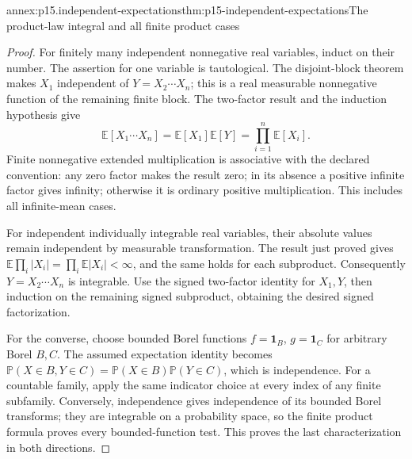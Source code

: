 \begin{annexitem}{annex:p15.independent-expectations}{thm:p15-independent-expectations}{The product-law integral and all finite product cases}
\begin{proof}
For finitely many independent nonnegative real variables, induct on
their number. The assertion for one variable is tautological. The
disjoint-block theorem makes \(X_1\) independent of
\(Y=X_2\cdots X_n\); this is a real measurable nonnegative
function of the remaining finite block. The two-factor result and
the induction hypothesis give
\[
 \mathbb E[X_1\cdots X_n]=\mathbb E[X_1]\mathbb E[Y]
                      =\prod_{i=1}^n\mathbb E[X_i].
\]
Finite nonnegative extended multiplication is associative with the
declared convention: any zero factor makes the result zero; in its
absence a positive infinite factor gives infinity; otherwise it is
ordinary positive multiplication. This includes all infinite-mean cases.

For independent individually integrable real variables, their absolute
values remain independent by measurable transformation. The result
just proved gives
\(\mathbb E\prod_i|X_i|=\prod_i\mathbb E|X_i|<\infty\),
and the same holds for each subproduct. Consequently
\(Y=X_2\cdots X_n\) is integrable. Use the signed two-factor
identity for \(X_1,Y\), then induction on the remaining signed
subproduct, obtaining the desired signed factorization.

For the converse, choose bounded Borel functions
\(f=\mathbf1_B\), \(g=\mathbf1_C\) for arbitrary Borel
\(B,C\). The assumed expectation identity becomes
\(\mathbb P(X\in B,Y\in C)=\mathbb P(X\in B)\mathbb P(Y\in C)\),
which is independence. For a countable family, apply the same
indicator choice at every index of any finite subfamily. Conversely,
independence gives independence of its bounded Borel transforms;
they are integrable on a probability space, so the finite product
formula proves every bounded-function test. This proves the last
characterization in both directions.
\end{proof}
\end{annexitem}

